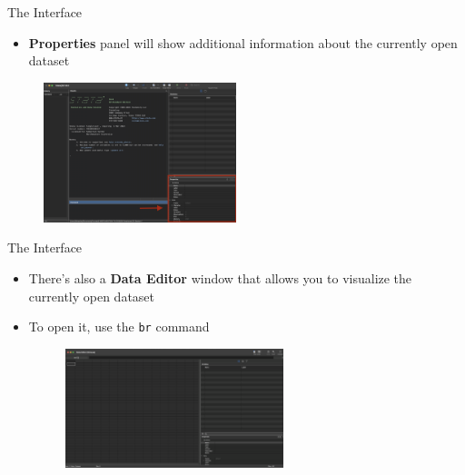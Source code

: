 \documentclass[11pt,notes=hide,aspectratio=169,mathserif]{beamer}
\begin{document}
\begin{frame}{The Interface}
\begin{itemize}
    \item \textbf{Properties} panel will show additional information about the currently open dataset
\end{itemize}
\begin{figure}
    \centering
    \includegraphics[width=0.5\textwidth]{inputs/ta1_result_window6.png}
\end{figure}
\end{frame}

\begin{frame}{The Interface}
    \begin{itemize}
    \item There's also a \textbf{Data Editor} window that allows you to visualize the currently open dataset 
    \item To open it, use the \texttt{br} command
        \begin{figure}
            \centering
            \includegraphics[width=0.6\textwidth]{inputs/ta1_stata_data.png}
        \end{figure}
    \end{itemize}
\end{frame}
\end{document}
